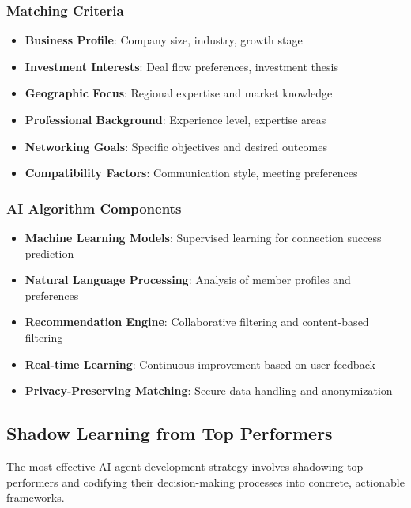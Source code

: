 \subsubsection{Matching Criteria}
\begin{itemize}
    \item \textbf{Business Profile}: Company size, industry, growth stage
    \item \textbf{Investment Interests}: Deal flow preferences, investment thesis
    \item \textbf{Geographic Focus}: Regional expertise and market knowledge
    \item \textbf{Professional Background}: Experience level, expertise areas
    \item \textbf{Networking Goals}: Specific objectives and desired outcomes
    \item \textbf{Compatibility Factors}: Communication style, meeting preferences
\end{itemize}

\subsubsection{AI Algorithm Components}
\begin{itemize}
    \item \textbf{Machine Learning Models}: Supervised learning for connection success prediction
    \item \textbf{Natural Language Processing}: Analysis of member profiles and preferences
    \item \textbf{Recommendation Engine}: Collaborative filtering and content-based filtering
    \item \textbf{Real-time Learning}: Continuous improvement based on user feedback
    \item \textbf{Privacy-Preserving Matching}: Secure data handling and anonymization
\end{itemize}

\subsection{Shadow Learning from Top Performers}
The most effective AI agent development strategy involves shadowing top performers and codifying their decision-making processes into concrete, actionable frameworks.

